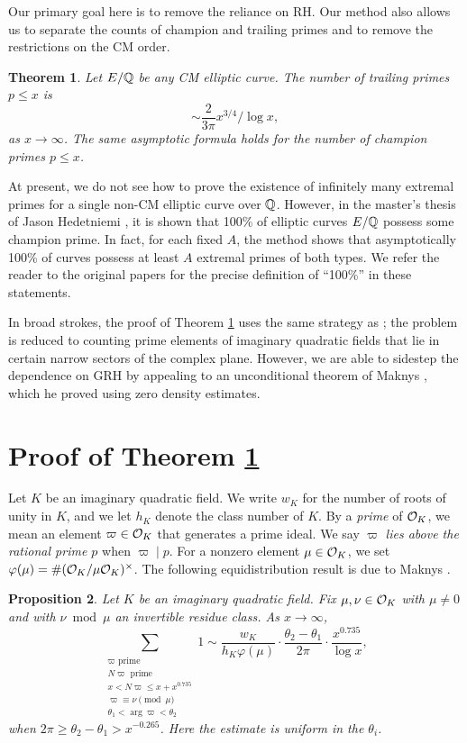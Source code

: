 \documentclass[12pt]{amsart}
\newtheorem{thm}{Theorem}
\newtheorem{prop}[thm]{Proposition}
\theoremstyle{remark}
\begin{document}
Our primary goal here is to remove the reliance on RH. Our method also allows us to separate the counts of champion and trailing primes and to remove the restrictions on the CM order.
\begin{thm}\label{thm:main} Let $E/\mathbb{Q}$ be any CM elliptic curve. The number of trailing primes $p\le x$ is \[ \sim \frac{2}{3\pi} x^{3/4}/\log{x},\] as $x\to\infty$. The same asymptotic formula holds for the number of champion primes $p\le x$.
\end{thm}

At present, we do not see how to prove the existence of infinitely many extremal primes for a single non-CM elliptic curve over $\mathbb{Q}$. However, in the master's thesis of Jason Hedetniemi \cite{hedetniemi12, HJX14}, it is shown that 100\% of elliptic curves $E/\mathbb{Q}$ possess some champion prime. In fact, for each fixed $A$, the method shows that asymptotically 100\% of curves possess at least $A$ extremal primes of both types. We refer the reader to the original papers for the precise definition of ``100\%'' in these statements.

In broad strokes, the proof of Theorem \ref{thm:main} uses the same strategy as \cite{JTTWZ16}; the problem is reduced to counting prime elements of imaginary quadratic fields that lie in certain narrow sectors of the complex plane. However, we are able to sidestep the dependence on GRH by appealing to an unconditional theorem of Maknys \cite{maknys83}, which he  proved using zero density estimates.

\section{Proof of Theorem \ref{thm:main}}
Let $K$ be an imaginary quadratic field. We write $w_K$ for the number of roots of unity in $K$, and we let $h_K$ denote the class number of $K$. By a \emph{prime} of $\mathcal{O}_K$, we mean an element $\varpi \in \mathcal{O}_K$ that generates a prime ideal. We say $\varpi$ \emph{lies above the rational prime $p$} when $\varpi \mid p$. For a nonzero element $\mu \in \mathcal{O}_K$, we set $\varphi(\mu) = \#(\mathcal{O}_K/\mu\mathcal{O}_K)^{\times}$. The following equidistribution result is due to Maknys \cite{maknys83}.

\begin{prop}\label{prop:mak} Let $K$ be an imaginary quadratic field. Fix $\mu, \nu \in \mathcal{O}_K$ with $\mu \ne 0$ and with $\nu\bmod{\mu}$ an invertible residue class. As $x\to\infty$,
\[ \sum_{\substack{\varpi\text{ prime} \\ N\varpi \text{ prime} \\ x < N\varpi \le x+x^{0.735} \\ \varpi \equiv \nu \pmod{\mu} \\ \theta_1 < \arg\varpi <\theta_2}} 1 \sim \frac{w_K}{h_K \varphi(\mu)} \cdot \frac{\theta_2-\theta_1}{2\pi} \cdot \frac{x^{0.735}}{\log{x}}, \]
when $2\pi \ge \theta_2-\theta_1 > x^{-0.265}$. Here the estimate is  uniform in the $\theta_i$.
\end{prop}
\end{document}
